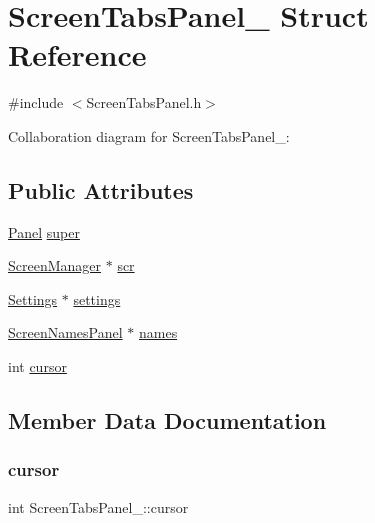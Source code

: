 \hypertarget{structScreenTabsPanel__}{}\section{Screen\+Tabs\+Panel\+\_\+ Struct Reference}
\label{structScreenTabsPanel__}


{\ttfamily \#include $<$Screen\+Tabs\+Panel.\+h$>$}



Collaboration diagram for Screen\+Tabs\+Panel\+\_\+\+:
\subsection*{Public Attributes}
\begin{DoxyCompactItemize}
\item 
\hyperlink{Panel_8h_a034d4c16521db412dc7a1e8536d16fae}{Panel} \hyperlink{structScreenTabsPanel___a07be6745915978bd25e69ba505ae68e2}{super}
\item 
\hyperlink{ScreenManager_8h_a798c9c69dc8024a4c6829982bf94dddd}{Screen\+Manager} $\ast$ \hyperlink{structScreenTabsPanel___aa84aea6c71b89aeae10befc97ba9c097}{scr}
\item 
\hyperlink{Settings_8h_ad97e5960b63f21c02bf5e0e43c0ef002}{Settings} $\ast$ \hyperlink{structScreenTabsPanel___a4a257a802f9cff5d3656a4af82655e2b}{settings}
\item 
\hyperlink{ScreenTabsPanel_8h_a84aa43c201d271221a4cf53cd978fc6a}{Screen\+Names\+Panel} $\ast$ \hyperlink{structScreenTabsPanel___aed5d1ad78aabe951a7c3871713f98ee9}{names}
\item 
int \hyperlink{structScreenTabsPanel___aea7a241e7e68c213869f72d1204cb0fd}{cursor}
\end{DoxyCompactItemize}


\subsection{Member Data Documentation}
\mbox{\label{structScreenTabsPanel___aea7a241e7e68c213869f72d1204cb0fd}} 
\subsubsection{\texorpdfstring{cursor}{cursor}}
{\footnotesize\ttfamily int Screen\+Tabs\+Panel\+\_\+\+::cursor}


